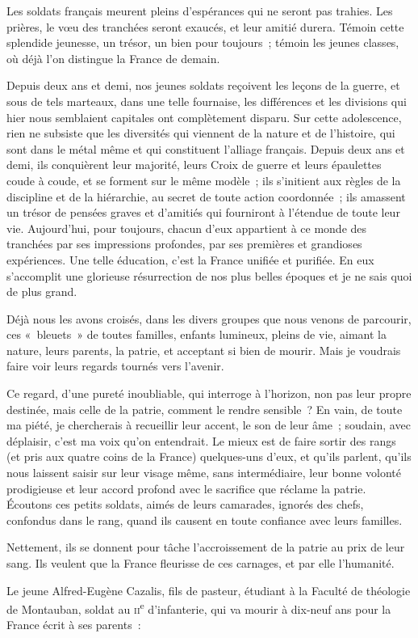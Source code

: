 \documentclass[french,twoside]{book} %
\newcommand\chaptercont{} %
\begin{document}
\chaptercont
\noindent Les soldats français meurent pleins d’espérances qui ne seront pas trahies. Les prières, le vœu des tranchées seront exaucés, et leur amitié durera. Témoin cette splendide jeunesse, un trésor, un bien pour toujours ; témoin les jeunes classes, où déjà l’on distingue la France de demain.‌\par
Depuis deux ans et demi, nos jeunes soldats reçoivent les leçons de la guerre, et sous de tels marteaux, dans une telle fournaise, les différences et les divisions qui hier nous semblaient capitales ont complètement disparu. Sur cette adolescence, rien ne subsiste que les diversités qui viennent de la nature et de l’histoire, qui sont dans le métal même et qui constituent l’alliage français. Depuis deux ans et demi, ils conquièrent leur majorité, leurs Croix de guerre et leurs épaulettes coude à coude, et se forment sur le même modèle ; ils s’initient aux règles de la discipline et de la hiérarchie, au secret de toute action coordonnée ; ils amassent un trésor de pensées graves et d’amitiés qui fourniront à l’étendue de toute leur vie. Aujourd’hui, pour toujours, chacun d’eux appartient à ce monde des tranchées par ses impressions profondes, par ses premières et grandioses expériences. Une telle éducation, c’est la France unifiée et purifiée. En eux s’accomplit une glorieuse résurrection de nos plus belles époques et je ne sais quoi de plus grand.‌\par
Déjà nous les avons croisés, dans les divers groupes que nous venons de parcourir, ces « bleuets » de toutes familles, enfants lumineux, pleins de vie, aimant la nature, leurs parents, la patrie, et acceptant si bien de mourir. Mais je voudrais faire voir leurs regards tournés vers l’avenir.‌\par
Ce regard, d’une pureté inoubliable, qui interroge à l’horizon, non pas leur propre destinée, mais celle de la patrie, comment le rendre sensible ? En vain, de toute ma piété, je chercherais à recueillir leur accent, le son de leur âme ; soudain, avec déplaisir, c’est ma voix qu’on entendrait. Le mieux est de faire sortir des rangs (et pris aux quatre coins de la France) quelques-uns d’eux, et qu’ils parlent, qu’ils nous laissent saisir sur leur visage même, sans intermédiaire, leur bonne volonté prodigieuse et leur accord profond avec le sacrifice que réclame la patrie. Écoutons ces petits soldats, aimés de leurs camarades, ignorés des chefs, confondus dans le rang, quand ils causent en toute confiance avec leurs familles.‌\par
Nettement, ils se donnent pour tâche l’accroissement de la patrie au prix de leur sang. Ils veulent que la France fleurisse de ces carnages, et par elle l’humanité.‌\par
Le jeune Alfred-Eugène Cazalis, fils de pasteur, étudiant à la Faculté de théologie de Montauban, soldat au \textsc{ii}\textsuperscript{e} d’infanterie, qui va mourir à dix-neuf ans pour la France écrit à ses parents :‌\par
\end{document}

